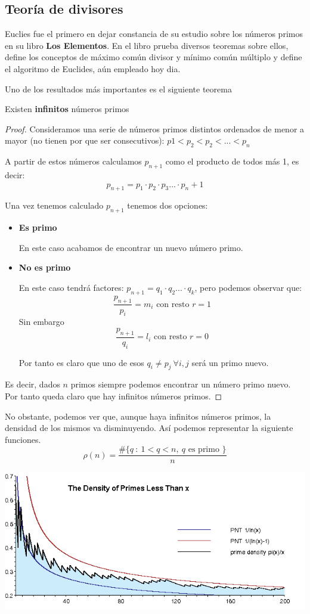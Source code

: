 \documentclass{apuntes}
\begin{document}
\subsection{Teoría de divisores}
Euclies fue el primero en dejar constancia de su estudio sobre los números primos en su libro \textbf{Los Elementos}. En el libro prueba diversos teoremas sobre ellos, define los conceptos de máximo común divisor y mínimo común múltiplo y define el algoritmo de Euclides, aún empleado hoy dia.

Uno de los resultados más importantes es el siguiente teorema
\begin{theorem}
Existen \textbf{infinitos} números primos
\end{theorem}
\begin{proof}
Consideramos una serie de números primos distintos ordenados de menor a mayor (no tienen por que ser consecutivos): $p1<p_2<p_2<...<p_n$

A partir de estos números calculamos $p_{n+1}$ como el producto de todos más 1, es decir:
\[p_{n+1}=p_1\cdot p_2 \cdot p_3 ... \cdot p_n+1\]

Una vez tenemos calculado $p_{n+1}$ tenemos dos opciones:
\begin{itemize}
\item \textbf{Es primo}

En este caso acabamos de encontrar un nuevo número primo.

\item \textbf{No es primo}

En este caso tendrá factores: $p_{n+1}=q_1\cdot q_2 ... \cdot q_k$, pero podemos observar que:
\[\frac{p_{n+1}}{p_i}=m_i \text{ con resto } r= 1\]
Sin embargo
\[\frac{p_{n+1}}{q_i}=l_i \text{ con resto } r= 0\]

Por tanto es claro que uno de esos $q_i \neq p_j \ \forall i,j$ será un primo nuevo.

\end{itemize}

Es decir, dados $n$ primos siempre podemos encontrar un número primo nuevo. Por tanto queda claro que hay infinitos números primos.

\end{proof}

No obstante, podemos ver que, aunque haya infinitos números primos, la densidad de los mismos va disminuyendo. Así podemos representar la siguiente funciones.
\[ρ(n)=\frac{\#\{q \ : \ 1 < q < n, \ q \text{ es primo }\}}{n}\]
\begin{center}
\includegraphics[width=0.8\linewidth]{img/density.png}
\end{center}
\end{document}
